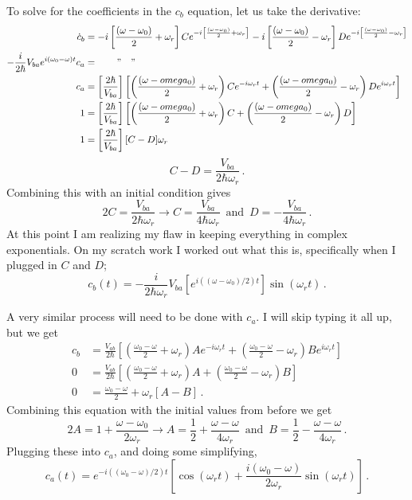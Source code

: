 \documentclass[11pt]{article}
\begin{document}
\begin{enumerate}[label=\alph*)]
To solve for the coefficients in the $c_b$ equation, let us take the derivative: 
\begin{align*}
\dot{c}_b & = -i\left[\frac{(\omega - \omega_0)}{2} + \omega_r\right]Ce^{-i\left[\frac{(\omega - \omega_0)}{2} + \omega_r\right]} -i\left[\frac{(\omega - \omega_0)}{2} - \omega_r\right]De^{-i\left[\frac{(\omega - \omega_0)}{2} - \omega_r\right]}\\
-\frac{i}{2\hbar}V_{ba}e^{i(\omega_0-\omega)t}c_a & = \qquad " \quad "\\
c_a & = \left[\frac{2\hbar}{V_{ba}}\right]\left[\left(\frac{(\omega-omega_0)}{2} + \omega_r\right)Ce^{-i\omega_r t} + \left(\frac{(\omega-omega_0)}{2} - \omega_r\right)De^{i\omega_r t}\right]\\
1 & = \left[\frac{2\hbar}{V_{ba}}\right]\left[\left(\frac{(\omega-omega_0)}{2} + \omega_r\right)C + \left(\frac{(\omega-omega_0)}{2} - \omega_r\right)D\right]\\
1 & = \left[\frac{2\hbar}{V_{ba}}\right][C-D]\omega_r
\end{align*}
\[C - D = \frac{V_{ba}}{2\hbar \omega_r} \, .\]
Combining this with an initial condition gives
\[2C = \frac{V_{ba}}{2\hbar \omega_r} \rightarrow C = \frac{V_{ba}}{4\hbar \omega_r} \, \text{ and } \, D = -\frac{V_{ba}}{4\hbar \omega_r} \, .\]
At this point I am realizing my flaw in keeping everything in complex exponentials. On my scratch work I worked out what this is, specifically when I plugged in $C$ and $D$; 
\[c_b(t)  = -\frac{i}{2\hbar \omega_r}V_{ba} \left[e^{i((\omega-\omega_0)/2)t}\right]\sin(\omega_r t) \, .\]

A very similar process will need to be done with $c_a$. I will skip typing it all up, but we get
\begin{align*}
c_b & = \frac{V_{ab}}{2\hbar}\left[\left(\frac{\omega_0 - \omega}{2} + \omega_r\right)Ae^{-i\omega_r t} + \left(\frac{\omega_0 - \omega}{2} - \omega_r\right)Be^{i\omega_r t}\right]\\
0 & = \frac{V_{ab}}{2\hbar}\left[\left(\frac{\omega_0 - \omega}{2} + \omega_r\right)A + \left(\frac{\omega_0 - \omega}{2} - \omega_r\right)B\right]\\
0 & = \frac{\omega_0-\omega}{2}+ \omega_r[A-B] \, .
\end{align*}
Combining this equation with the initial values from before we get
\[2A = 1 + \frac{\omega-\omega_0}{2\omega_r} \rightarrow A = \frac{1}{2} + \frac{\omega-\omega}{4\omega_r} \, \text{ and } \, B = \frac{1}{2} - \frac{\omega-\omega}{4\omega_r} \, .\]
Plugging these into $c_a$, and doing some simplifying,
\[c_a(t) = e^{-i((\omega_0 - \omega)/2)t}\left[\cos(\omega_r t) + \frac{i(\omega_0 - \omega)}{2\omega_r}\sin(\omega_r t)\right] \, .\]


\end{enumerate}
\end{document}
